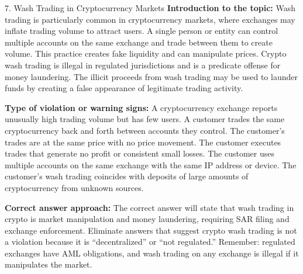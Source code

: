 \documentclass[11pt,a4paper]{beamer}
\begin{document}
\begin{frame}{7. Wash Trading in Cryptocurrency Markets}
\tiny
\noindent\textbf{Introduction to the topic:} Wash trading is particularly common in cryptocurrency markets, where exchanges may inflate trading volume to attract users. A single person or entity can control multiple accounts on the same exchange and trade between them to create volume. This practice creates fake liquidity and can manipulate prices. Crypto wash trading is illegal in regulated jurisdictions and is a predicate offense for money laundering. The illicit proceeds from wash trading may be used to launder funds by creating a false appearance of legitimate trading activity.

\vspace{0.1cm}
\noindent\textbf{Type of violation or warning signs:} A cryptocurrency exchange reports unusually high trading volume but has few users. A customer trades the same cryptocurrency back and forth between accounts they control. The customer's trades are at the same price with no price movement. The customer executes trades that generate no profit or consistent small losses. The customer uses multiple accounts on the same exchange with the same IP address or device. The customer's wash trading coincides with deposits of large amounts of cryptocurrency from unknown sources.

\vspace{0.1cm}
\noindent\textbf{Correct answer approach:} The correct answer will state that wash trading in crypto is market manipulation and money laundering, requiring SAR filing and exchange enforcement. Eliminate answers that suggest crypto wash trading is not a violation because it is “decentralized” or “not regulated.” Remember: regulated exchanges have AML obligations, and wash trading on any exchange is illegal if it manipulates the market.
\end{frame}
\end{document}
